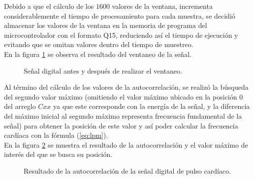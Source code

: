 Debido a que el cálculo de los $1600$ valores de la ventana, incrementa considerablemente el tiempo de procesamiento para cada muestra, se decidió almacenar los valores de la ventana en la memoria de programa del microcontrolador con el formato Q15, reduciendo así el tiempo de ejecución y evitando que se omitan valores dentro del tiempo de muestreo. \\

En la figura \ref{fig:ventaneo} se observa el resultado del ventaneo de la señal. \\

\begin{figure}[htbp!]
	\centering
	\caption{Señal digital antes y después de realizar el ventaneo.}
	\label{fig:ventaneo}
\end{figure}

Al término del cálculo de los valores de la autocorrelación, se realizó la búsqueda del segundo valor máximo (omitiendo el valor máximo ubicado en la posición $0$ del arreglo $Cxx$ ya que este corresponde con la energía de la señal, y la diferencia del máximo inicial al segundo máximo representa frecuencia fundamental de la señal) para obtener la posición de este valor y así poder calcular la frecuencia cardíaca con la fórmula (\ref{eq:lpm}). \\

En la figura \ref{fig:autocorr} se muestra el resultado de la autocorrelación y el valor máximo de interés del que se busca su posición. \\

\begin{figure}[htbp!]
	\centering
	\caption{Resultado de la autocorrelación de la señal digital de pulso cardíaco.}
	\label{fig:autocorr}
\end{figure}


